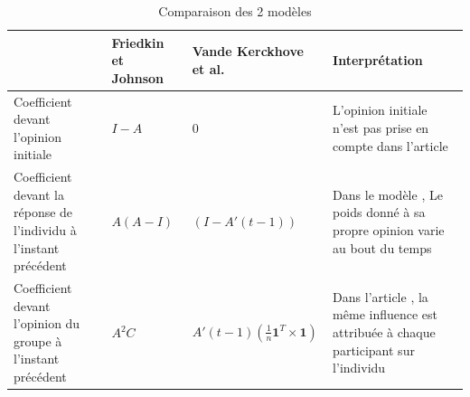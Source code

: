 \documentclass{scrreprt}
\begin{document}
\begin{table}
	\begin{tabular}{|p{3cm}|p{3.375cm}|p{3.375cm}|p{3.375cm}|}
		\hline
 & Friedkin et Johnson \cite{FJ} & Vande Kerckhove et al. \cite{VMG} & Interprétation \tabularnewline
		\hline
Coefficient devant l'opinion initiale & $I-A$ & $0$ & L'opinion initiale n'est pas prise en compte dans l'article \cite{VMG} \tabularnewline
		\hline
Coefficient devant la réponse de l'individu à l'instant précédent & $A(A-I)$ & $(I-A'(t-1))$ & Dans le modèle  \cite{VMG}, Le poids donné à sa propre opinion varie au bout du temps \tabularnewline
		\hline
Coefficient devant l'opinion du groupe à l'instant précédent & $A^{2}C$ & $A'(t-1)(\frac{1}{n} \textbf{1} ^T\times \textbf{1})$ & Dans l'article \cite{VMG}, la même influence est attribuée à chaque participant sur l'individu \tabularnewline
		\hline
	\end{tabular}
	\caption{Comparaison des 2 modèles}
\end{table}
\end{document}
